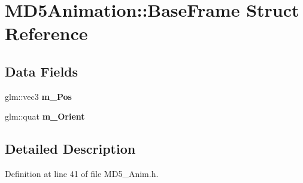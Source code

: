 \hypertarget{struct_m_d5_animation_1_1_base_frame}{}\section{M\+D5\+Animation\+:\+:Base\+Frame Struct Reference}
\label{struct_m_d5_animation_1_1_base_frame}
\subsection*{Data Fields}
\begin{DoxyCompactItemize}
\item 
glm\+::vec3 {\bfseries m\+\_\+\+Pos}\hypertarget{struct_m_d5_animation_1_1_base_frame_a9586b0574582517cc2968703e07588b0}{}\label{struct_m_d5_animation_1_1_base_frame_a9586b0574582517cc2968703e07588b0}

\item 
glm\+::quat {\bfseries m\+\_\+\+Orient}\hypertarget{struct_m_d5_animation_1_1_base_frame_ae60903c1a92bf95597fa9c5c963d0ea9}{}\label{struct_m_d5_animation_1_1_base_frame_ae60903c1a92bf95597fa9c5c963d0ea9}

\end{DoxyCompactItemize}


\subsection{Detailed Description}


Definition at line 41 of file M\+D5\+\_\+\+Anim.\+h.

